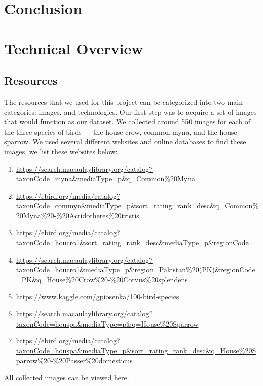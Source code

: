 \documentclass[11pt]{article}
\begin{document}
\section{Conclusion}
\newpage

\section{Technical Overview}
\subsection{Resources}
  The resources that we used for this project can be categorized into two main 
  categories: images, and technologies. Our first step was to acquire a set of images that would 
  function as our dataset. We collected around 550 images for each of the three 
  species of birds --- the house crow, common myna, and the house sparrow. We used 
  several different websites and online databases to find these images, we list 
  these websites below: 
  \begin{enumerate}
    \item \url{https://search.macaulaylibrary.org/catalog?taxonCode=myna&mediaType=p&q=Common\%20Myna}
    \item \url{https://ebird.org/media/catalog?taxonCode=commyn&mediaType=p&sort=rating_rank_desc&q=Common\%20Myna\%20-\%20Acridotheres\%20tristis}
    \item \url{https://ebird.org/media/catalog?taxonCode=houcro1&sort=rating_rank_desc&mediaType=p&regionCode=}
    \item \url{https://search.macaulaylibrary.org/catalog?taxonCode=houcro1&mediaType=p&region=Pakistan\%20(PK)&regionCode=PK&q=House\%20Crow\%20-\%20Corvus\%20splendens}
    \item \url{https://www.kaggle.com/gpiosenka/100-bird-species}
    \item \url{https://search.macaulaylibrary.org/catalog?taxonCode=houspa&mediaType=p&q=House\%20Sparrow}
    \item \url{https://ebird.org/media/catalog?taxonCode=houspa&mediaType=p&sort=rating_rank_desc&q=House\%20Sparrow\%20-\%20Passer\%20domesticus}
    \label{imagelinks}
  \end{enumerate}
  \setlength{\parskip}{1em}
  All collected images can be viewed \hyperlink{https://drive.google.com/drive/folders/18k-roE_VJSB1dcrhvN1y_EosVF7Kb0dY?usp=sharing}{here}.
\end{document}
